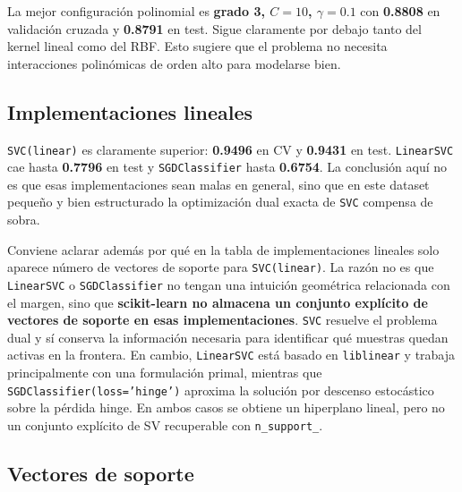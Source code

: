 \documentclass[11pt,a4paper]{article}
\newcommand{\tbl}[3]{
\begin{table}[H]
\centering
\caption{#2}
\label{#3}
\scriptsize

\end{table}
}
\begin{document}
\tbl{svm_poly_grid}{GridSearch y configuraciones representativas para SVM con kernel polinomial.}{tab:svm_poly}

La mejor configuración polinomial es \textbf{grado 3, \(C=10\), \(\gamma=0.1\)} con \textbf{0.8808} en validación cruzada y \textbf{0.8791} en test. Sigue claramente por debajo tanto del kernel lineal como del RBF. Esto sugiere que el problema no necesita interacciones polinómicas de orden alto para modelarse bien.

\subsection{Implementaciones lineales}

\tbl{svm_linear_impl}{Comparación entre \texttt{SVC(linear)}, \texttt{LinearSVC} y \texttt{SGDClassifier}.}{tab:svm_linear_impl}

\texttt{SVC(linear)} es claramente superior: \textbf{0.9496} en CV y \textbf{0.9431} en test. \texttt{LinearSVC} cae hasta \textbf{0.7796} en test y \texttt{SGDClassifier} hasta \textbf{0.6754}. La conclusión aquí no es que esas implementaciones sean malas en general, sino que en este dataset pequeño y bien estructurado la optimización dual exacta de \texttt{SVC} compensa de sobra.

Conviene aclarar además por qué en la tabla de implementaciones lineales solo aparece número de vectores de soporte para \texttt{SVC(linear)}. La razón no es que \texttt{LinearSVC} o \texttt{SGDClassifier} no tengan una intuición geométrica relacionada con el margen, sino que \textbf{scikit-learn no almacena un conjunto explícito de vectores de soporte en esas implementaciones}. \texttt{SVC} resuelve el problema dual y sí conserva la información necesaria para identificar qué muestras quedan activas en la frontera. En cambio, \texttt{LinearSVC} está basado en \texttt{liblinear} y trabaja principalmente con una formulación primal, mientras que \texttt{SGDClassifier(loss='hinge')} aproxima la solución por descenso estocástico sobre la pérdida hinge. En ambos casos se obtiene un hiperplano lineal, pero no un conjunto explícito de SV recuperable con \texttt{n\_support\_}.

\subsection{Vectores de soporte}

\tbl{svm_support_vectors}{Comparación del número de vectores de soporte en configuraciones representativas.}{tab:svm_sv}
\end{document}
